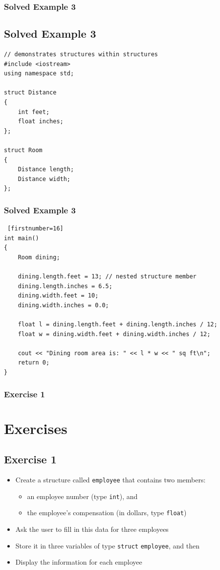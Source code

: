\documentclass{beamer}
\begin{document}
\begin{frame} [fragile]
    \frametitle{Solved Example 3}
    \subsection{Solved Example 3} %
    \label{sub:solved_example_3}
    \lstset{style=mystyle}
\begin{lstlisting}
// demonstrates structures within structures
#include <iostream>
using namespace std;

struct Distance
{
    int feet;
    float inches;
};

struct Room
{
    Distance length;
    Distance width;
};

\end{lstlisting}
\end{frame}

\begin{frame} [fragile]
    \frametitle{Solved Example 3}
    \lstset{style=mystyle}
\begin{lstlisting} [firstnumber=16]
int main()
{
    Room dining;

    dining.length.feet = 13; // nested structure member
    dining.length.inches = 6.5;
    dining.width.feet = 10;
    dining.width.inches = 0.0;

    float l = dining.length.feet + dining.length.inches / 12;
    float w = dining.width.feet + dining.width.inches / 12;

    cout << "Dining room area is: " << l * w << " sq ft\n";
    return 0;
}
\end{lstlisting}
\end{frame}

\begin{frame}
    \frametitle{Exercise 1}
    \section{Exercises} %
    \label{sec:exercises}
    \subsection{Exercise 1} %
    \label{sub:exercise_1}
    \begin{itemize}
        \item Create a structure called \texttt{employee} that contains two members:
        \begin{itemize}
            \item an employee number (type \texttt{int}), and
            \item the employee's compensation (in dollars, type \texttt{float})
        \end{itemize}
        \item Ask the user to fill in this data for three employees
        \item Store it in three variables of type \texttt{struct} \texttt{employee}, and then
        \item Display the information for each employee
    \end{itemize}
\end{frame}
\end{document}

